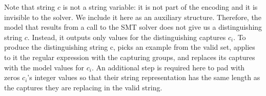 Note that string \(c\) is not a string variable: it is not part of the encoding and it is invisible to the solver. We include it here as an auxiliary structure. Therefore, the model that results from a call to the \ac{SMT} solver does not give us a distinguishing string \(c\). Instead, it outputs only values for the distinguishing captures \(c_i\). To produce the distinguishing string c, \Forest picks an example from the valid set, applies to it the regular expression with the capturing groups, and replaces its captures with the model values for \(c_i\). An additional step is required here to pad with zeros \(c_i\)'s integer values so that their string representation has the same length as the captures they are replacing in the valid string.







